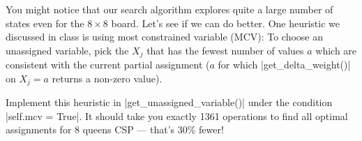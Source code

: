 \item {}
You might notice that our search algorithm explores quite a large number of
states even for the $8\times 8$ board. Let's see if we can do better. One
heuristic we discussed in class is using most constrained variable (MCV): To
choose an unassigned variable, pick the $X_j$ that has the fewest number of
values $a$ which are consistent with the current partial assignment ($a$ for
which |get_delta_weight()| on $X_j=a$ returns a non-zero value).

Implement this heuristic in |get_unassigned_variable()| under the condition
|self.mcv = True|. It should take you exactly 1361 operations to find all
optimal assignments for 8 queens CSP --- that's 30\% fewer!

